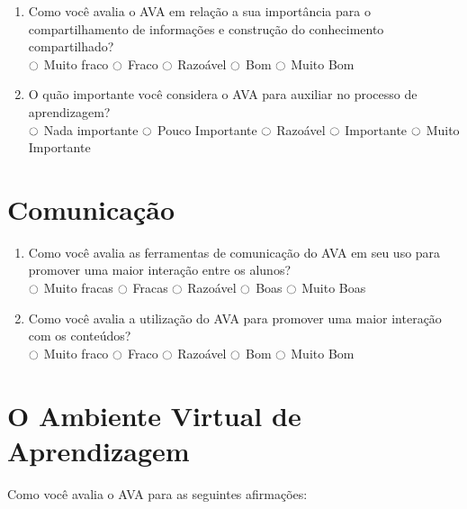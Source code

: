 \begin{enumerate}
\item Como você avalia o AVA em relação a sua importância para o compartilhamento de informações e construção do conhecimento compartilhado? \\ 
$\ocircle$ Muito fraco  $\ocircle$ Fraco $\ocircle$ Razoável $\ocircle$ Bom $\ocircle$ Muito Bom

\item O quão importante você considera o AVA para auxiliar no processo de aprendizagem? \\ 
$\ocircle$ Nada importante  $\ocircle$ Pouco Importante $\ocircle$ Razoável $\ocircle$ Importante $\ocircle$ Muito Importante

\end{enumerate}

\section{Comunicação}

\begin{enumerate}
  \item Como você avalia as ferramentas de comunicação do AVA em seu uso para promover uma maior interação entre os alunos? \\
  $\ocircle$ Muito fracas  $\ocircle$ Fracas $\ocircle$ Razoável $\ocircle$ Boas $\ocircle$ Muito Boas

  \item Como você avalia a utilização do AVA para promover uma maior interação com os conteúdos? \\
  $\ocircle$ Muito fraco  $\ocircle$ Fraco $\ocircle$ Razoável $\ocircle$ Bom $\ocircle$ Muito Bom

\end{enumerate}

\section{O Ambiente Virtual de Aprendizagem}

\noindent
Como você avalia o AVA para as seguintes afirmações:\\

